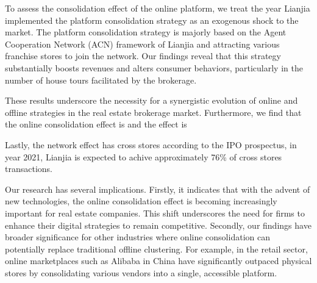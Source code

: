 \documentclass[11pt]{article}
\begin{document}
To assess the consolidation effect of the online platform, we treat the year Lianjia implemented the platform consolidation strategy as an exogenous shock to the market. The platform consolidation strategy is majorly based on the Agent Cooperation Network (ACN) framework of Lianjia and attracting various franchise stores to join the network. Our findings reveal that this strategy substantially boosts revenues and alters consumer behaviors, particularly in the number of house tours facilitated by the brokerage. 











These results underscore the necessity for a synergistic evolution of online and offline strategies in the real estate brokerage market. Furthermore, we find that the online consolidation effect is and the effect is 

Lastly, the network effect has cross stores according to the IPO prospectus, in year 2021, Lianjia is expected to achive approximately 76\% of cross stores transactions.



















Our research has several implications. Firstly, it indicates that with the advent of new technologies, the online consolidation effect is becoming increasingly important for real estate companies. This shift underscores the need for firms to enhance their digital strategies to remain competitive. Secondly, our findings have broader significance for other industries where online consolidation can potentially replace traditional offline clustering. For example, in the retail sector, online marketplaces such as Alibaba in China have significantly outpaced physical stores by consolidating various vendors into a single, accessible platform.
\end{document}

